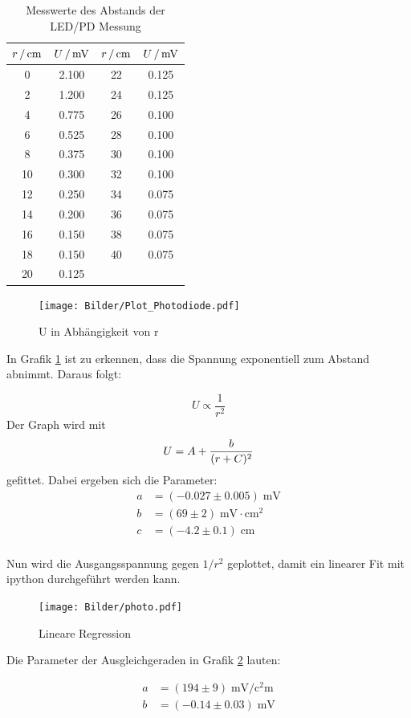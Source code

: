 \begin{table}[H]
  \centering
    \begin{tabular}{cccc}
      \toprule
      {$r \,/ \,\si{\centi\meter}$} & {$U \, / \,\si{\milli\volt}$} & {$r \,/\,\si{\centi\meter}$} & {$U \,/ \,\si{\milli\volt}$} \\
      \midrule
       0  &  2.100   &   22  &  0.125 \\
       2  &  1.200   &   24  &  0.125 \\
       4  &  0.775   &   26  &  0.100 \\
       6  &  0.525   &   28  &  0.100 \\
       8  &  0.375   &   30  &  0.100 \\
      10  &  0.300   &   32  &  0.100 \\
      12  &  0.250   &   34  &  0.075 \\
      14  &  0.200   &   36  &  0.075 \\
      16  &  0.150   &   38  &  0.075 \\
      18  &  0.150   &   40  &  0.075 \\
      20  &  0.125   &  \hrulefill     &  \hrulefill      \\
      \bottomrule
    \end{tabular}
    \caption{Messwerte des Abstands der LED/PD Messung}
    \label{tab:licht}
\end{table}

\begin{figure}[H]
  \centering
  \texttt{[image: Bilder/Plot\_Photodiode.pdf]}
  \caption{U in Abhängigkeit von r}
  \label{fig:led}
\end{figure}

In Grafik \ref{fig:led} ist zu erkennen, dass die Spannung exponentiell zum Abstand
abnimmt. Daraus folgt:

\begin{equation*}
  U \propto \frac{1}{r^2}
\end{equation*}
Der Graph wird mit
\begin{equation}
U = A + \frac{b}{(r+C)^2} \notag
\end{equation}
gefittet.
Dabei ergeben sich die Parameter:
\begin{align*}
  a &= (-0.027 ± 0.005) \; \si{\milli\volt} \\
  b &= (69 ± 2)    \;   \si{\milli\volt\cdot\centi\square\meter}        \\
  c &= (-4.2 ± 0.1) \; \si{\centi\meter}
\end{align*}
\\
Nun wird die Ausgangsspannung gegen $1/r^2$ geplottet, damit ein linearer Fit mit ipython durchgeführt
werden kann.

\begin{figure}[!h]
\centering
\texttt{[image: Bilder/photo.pdf]}
\caption{Lineare Regression}
\label{fig:lin}
\end{figure}

Die Parameter der Ausgleichgeraden in Grafik \ref{fig:lin} lauten:

\begin{align*}
    a &= (194 ± 9) \; \si{\milli\volt\per\square\centi\meter} \\
    b &= (-0.14 ± 0.03) \; \si{\milli\volt}
\end{align*}
